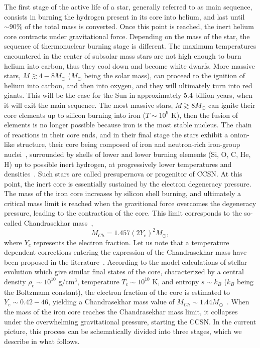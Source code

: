 The first stage of the active life of a star, generally referred to as main
sequence, consists in burning the hydrogen present in its core into helium,
and last until $\sim 90\%$ of the total mass is converted. Once this point is
reached, the inert helium core contracts under gravitational force.
% 
Depending on the mass of the star, the sequence of thermonuclear burning stage
is different. The maximum temperatures encountered in the center of subsolar 
mass stars are not high enough to burn helium into carbon, thus they cool down 
and become white dwarfs. 
More massive stars, $M \gtrsim 4-8M_\odot$ ($M_\odot$ being the solar mass), 
can proceed to the ignition of
helium into carbon, and then into oxygen, and they will ultimately turn into 
red giants. This will be the case for the Sun in approximately 5.4 billion 
years, when it will exit the main sequence.
The most massive stars, $M \gtrsim 8M_\odot$ can ignite their core elements up 
to silicon burning into iron ($T \sim 10^9$ K), then the fusion of elements is 
no longer possible because iron is the most stable nucleus. The chain of 
reactions in their core ends, and in their final stage the stars exhibit a 
onion-like structure, their core being composed of iron and neutron-rich 
iron-group nuclei~\cite{Bethe1979}, surrounded by shells of lower and lower 
burning elements (Si, O, C, He, H) up to possible inert hydrogen, at 
progressively lower temperatures and densities~\cite{Woosley2002}. 
Such stars are called presupernova or progenitor of CCSN. 
%
At this point, the inert core is essentially sustained by the electron
degeneracy pressure. 
The mass of the iron core increases by silicon shell burning, and ultimately a 
critical mass limit is reached when the gravitional force overcomes the 
degeneracy pressure, leading to the contraction of the core. 
This limit corresponds to the so-called Chandrasekhar 
mass~\cite{Chandrasekhar1931},
%
\begin{equation}
  M_{Ch} = 1.457(2Y_e)^2 M_\odot,
\end{equation}
%
where $Y_e$ represents the electron fraction. Let us note that a temperature
dependent corrections entering the expression of the Chandrasekhar mass have 
been proposed in the literature~\cite{Woosley2002}. 
According to the model calculations of stellar evolution which give similar 
final states of the core, characterized by a central density $\rho_c 
\sim 10^{10}$ g/cm$^3$, temperature $T_c \sim 10^{10}$ K, and entropy $s 
\sim k_B$ ($k_B$ being the Boltzmann constant), the electron fraction of the 
core is estimated to $Y_e \sim 0.42 - 46$, yielding a Chandrasekhar mass value 
of $M_{Ch} \sim 1.44 M_\odot$~\cite{Janka2007}.
%
When the mass of the iron core reaches the Chandrasekhar mass limit, it 
collapses under the overwhelming gravitational pressure, starting the CCSN. 
In the current picture, this process can be schematically divided into three 
stages, which we describe in what follows.

